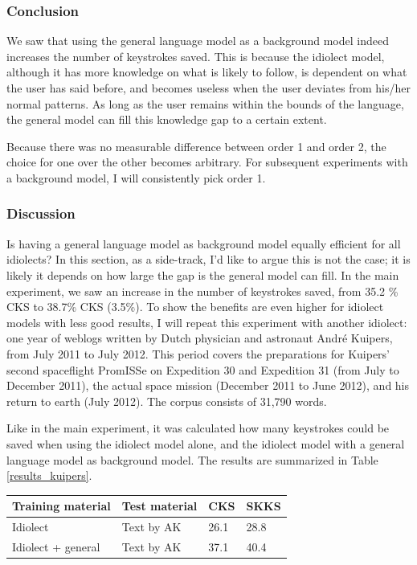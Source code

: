 \documentclass[11pt]{article}
\let\originaltable\table
\let\endoriginaltable\endtable
\renewenvironment{table}[1][ht]{%
  \originaltable[#1]
  \centering}%
  {\endoriginaltable}
\begin{document}
\subsubsection{Conclusion}
We saw that using the general language model as a background model indeed increases the number of keystrokes saved. This is because the idiolect model, although it has more knowledge on what is likely to follow, is dependent on what the user has said before, and becomes useless when the user deviates from his/her normal patterns. As long as the user remains within the bounds of the language, the general model can fill this knowledge gap to a certain extent.

Because there was no measurable difference between order 1 and order 2, the choice for one over the other becomes arbitrary. For subsequent experiments with a background model, I will consistently pick order 1.

\subsubsection{Discussion} \label{simple_exp_disc}
Is having a general language model as background model equally efficient for all idiolects? In this section, as a side-track, I'd like to argue this is not the case; it is likely it depends on how large the gap is the general model can fill. In the main experiment, we saw an increase in the number of keystrokes saved, from 35.2 \% CKS to 38.7\% CKS (3.5\%). To show the benefits are even higher for idiolect models with less good results, I will repeat this experiment with another idiolect: one year of weblogs written by Dutch physician and astronaut Andr\'e Kuipers, from July 2011 to July 2012. This period covers the preparations for Kuipers' second spaceflight PromISSe on Expedition 30 and Expedition 31 (from July to December 2011), the actual space mission (December 2011 to June 2012), and his return to earth (July 2012). The corpus consists of 31,790 words. 

Like in the main experiment, it was calculated how many keystrokes could be saved when using the idiolect model alone, and the idiolect model with a general language model as background model. The results are summarized in Table \ref{results_kuipers}. 

\begin{table}[H]
\begin{tabular}{ll|ll} 
Training material&Test material&CKS&SKKS\\
\hline
Idiolect&Text by AK&26.1&28.8\\
Idiolect + general&Text by AK&37.1&40.4\\
\end{tabular} 
\caption{Percentage of keystrokes that can be saved when using the idiolect of Andr\'e Kuipers, with and without background model} \label{results_kuipers}
\end{table}
\end{document}
